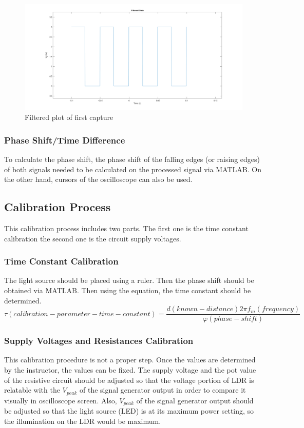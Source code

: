 \documentclass[letterpaper,12pt]{article}
\begin{document}
\begin{figure}[H]
	\centering
   \includegraphics[width=1\textwidth]{filtered_data_plot.png}
   \caption{Filtered plot of first capture}
\end{figure} 
\subsubsection{Phase Shift/Time Difference}
To calculate the phase shift, the phase shift of the falling edges (or raising edges) of both signals needed to be calculated on the processed signal via MATLAB. On the other hand, cursors of the oscilloscope can also be used.
\subsection{Calibration Process}
This calibration process includes two parts. The first one is the time constant calibration the second one is the circuit supply voltages. 
\subsubsection{Time Constant Calibration}
The light source should be placed using a ruler. Then the phase shift should be obtained via MATLAB. Then using the equation, the time constant should be determined.
\[ \tau (calibration-parameter-time-constant)  = \frac{ d(known-distance) 2 \pi f_m (frequency)   }{ \varphi (phase-shift)}\]

\subsubsection{Supply Voltages and Resistances Calibration}
This calibration procedure is not a proper step. Once the values are determined by the instructor, the values can be fixed. The supply voltage and the pot value of the resistive circuit should be adjusted so that the voltage portion of LDR is relatable with the \(V_{peak}\) of the signal generator output in order to compare it visually in oscilloscope screen. Also, \(V_{peak}\) of the signal generator output should be adjusted so that the light source (LED) is at its maximum power setting, so the illumination on the LDR would be maximum. 
\end{document}
